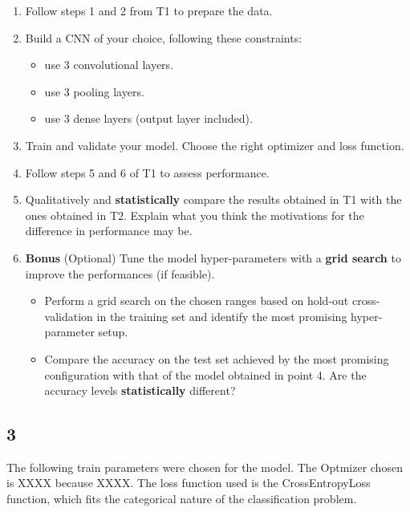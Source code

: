 \documentclass[11pt]{scrartcl}
\begin{document}
\begin{enumerate}
\item Follow steps 1 and 2 from T1 to prepare the data.

\item Build a CNN of your choice, following these constraints: 

	\begin{itemize}
	\item use 3 convolutional layers.
	\item use 3 pooling layers.
	\item use 3 dense layers (output layer included).
	\end{itemize}

\item Train and validate your model. Choose the right optimizer and loss function. 

\item Follow steps 5 and 6 of T1 to assess performance.

\item Qualitatively and \textbf{statistically} compare the results 
obtained in T1 with the ones obtained in T2. 
Explain what you think the motivations for the difference in performance may be.

\item \textbf{Bonus} (Optional) 
Tune the model hyper-parameters with a \textbf{grid search} 
to improve the performances (if feasible).

	\begin{itemize}
	\item Perform a grid search on the chosen ranges based on hold-out cross-validation 
	in the training set and identify the most promising hyper-parameter setup.

	\item Compare the accuracy on the test set achieved by the most promising configuration 
	with that of the model obtained in point 4. 
	Are the accuracy levels \textbf{statistically} different?
	\end{itemize}
\end{enumerate}

\subsection*{3}

The following train parameters were chosen for the model.
The Optmizer chosen is XXXX because XXXX.
The loss function used is the CrossEntropyLoss function, 
which fits the categorical nature of the classification problem.
\end{document}
